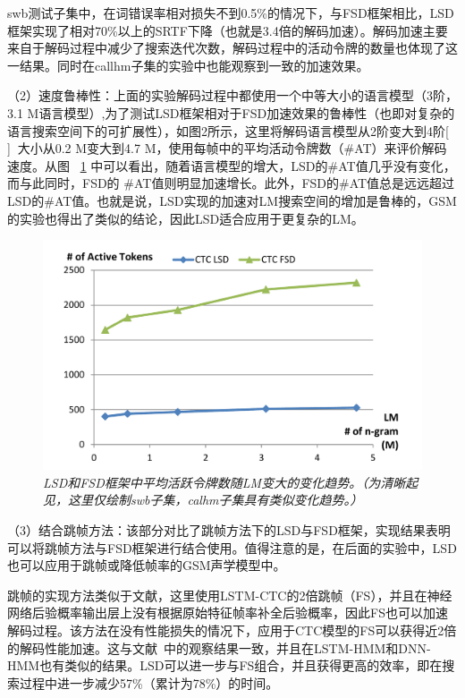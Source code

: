 swb测试子集中，在词错误率相对损失不到0.5\%的情况下，与FSD框架相比，LSD框架实现了相对70\%以上的SRTF下降（也就是3.4倍的解码加速）。解码加速主要来自于解码过程中减少了搜索迭代次数，解码过程中的活动令牌的数量也体现了这一结果。同时在callhm子集的实验中也能观察到一致的加速效果。

（2）速度鲁棒性：上面的实验解码过程中都使用一个中等大小的语言模型（3阶，3.1 M语言模型）,为了测试LSD框架相对于FSD加速效果的鲁棒性（也即对复杂的语言搜索空间下的可扩展性），如图2所示，这里将解码语言模型从2阶变大到4阶[ ]，大小从0.2 M变大到4.7 M，使用每帧中的平均活动令牌数（\#AT）来评价解码速度。从图 ~\ref{fig:ctc-dnn-lm-scaleup} 中可以看出，随着语言模型的增大，LSD的\#AT值几乎没有变化，而与此同时，FSD的 \#AT值则明显加速增长。此外，FSD的\#AT值总是远远超过LSD的\#AT值。也就是说，LSD实现的加速对LM搜索空间的增加是鲁棒的，GSM的实验也得出了类似的结论，因此LSD适合应用于更复杂的LM。
 

   \begin{figure}[tbhp!]
        \centering
        \includegraphics[width=\linewidth]{figure/speed-robust.pdf}
        \caption{{\it LSD和FSD框架中平均活跃令牌数随LM变大的变化趋势。（为清晰起见，这里仅绘制swb子集，calhm子集具有类似变化趋势。）}}
        \label{fig:ctc-dnn-lm-scaleup}
      \end{figure}

（3）结合跳帧方法：该部分对比了跳帧方法下的LSD与FSD框架，实现结果表明可以将跳帧方法与FSD框架进行结合使用。值得注意的是，在后面的实验中，LSD也可以应用于跳帧或降低帧率的GSM声学模型中。

跳帧的实现方法类似于文献\cite{miao2016simplifying}，这里使用LSTM-CTC的2倍跳帧（FS），并且在神经网络后验概率输出层上没有根据原始特征帧率补全后验概率，因此FS也可以加速解码过程。该方法在没有性能损失的情况下，应用于CTC模型的FS可以获得近2倍的解码性能加速。这与文献~\cite{pundak2016lower}中的观察结果一致，并且在LSTM-HMM\cite{miao2016simplifying}和DNN-HMM\cite{vanhoucke2013multiframe}也有类似的结果。LSD可以进一步与FS组合，并且获得更高的效率，即在搜索过程中进一步减少57\%（累计为78\%）的时间。


